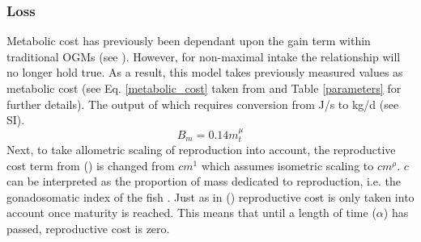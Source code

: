 \documentclass[a4paper, 11pt, hidelinks]{article} %
\begin{document}
	\subsubsection{Loss}
	Metabolic cost  has previously been dependant upon the gain term within traditional OGMs (see \cite{West2001, Hou2008}).  However, for non-maximal intake the relationship will no longer hold true.  As a result, this model takes previously measured values as metabolic cost (see Eq. \ref{metabolic_cost} taken from \cite{Peters1983} %
	and Table \ref{parameters} for further details).  The output of which requires conversion from J/s to kg/d (see SI).
	\begin{equation}
		\label{metabolic_cost}
		B_m = 0.14 m_t^\mu
	\end{equation}
	Next, to take allometric scaling of reproduction into account, the reproductive cost term from \citeauthor{Charnov2001} (\citeyear{Charnov2001}) is changed from $cm^1$ which assumes isometric scaling to $cm^\rho$.  $c$ can be interpreted as the proportion of mass dedicated to reproduction, i.e. the gonadosomatic index of the fish \parencite{Charnov2001}.  Just as in \citeauthor{Charnov2001} (\citeyear{Charnov2001}) reproductive cost is only taken into account once maturity is reached.  This means that until a length of time ($\alpha$) has passed, reproductive cost is zero.
	

	
	
\end{document}
